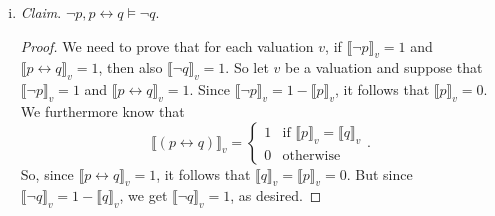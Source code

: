\begin{enumerate}[\thesection.1]
\begin{enumerate}[(i)]
			\item \emph{Claim}. $\neg p, p\leftrightarrow q\vDash \neg q$. 
			\begin{proof}
				We need to prove that for each valuation $v$, if $\llbracket \neg
				p\rrbracket_v=1$ and $\llbracket p\leftrightarrow q\rrbracket_v=1$,
				then also $\llbracket \neg q\rrbracket_v=1$. So let $v$ be a valuation
				and suppose that $\llbracket \neg p\rrbracket_v=1$ and $\llbracket
				p\leftrightarrow q\rrbracket_v=1$. Since $\llbracket \neg
				p\rrbracket_v=1-\llbracket p\rrbracket_v$, it follows that $\llbracket
				p\rrbracket_v=0$. We furthermore know that
				\[\llbracket(p\leftrightarrow q)\rrbracket_v=\begin{cases} 1 & \text{if
				} \llbracket p\rrbracket_v=\llbracket
					q\rrbracket_v\\0&\text{otherwise}\end{cases}.\] So, since $\llbracket
					p\leftrightarrow q\rrbracket_v=1$, it follows that $\llbracket
					q\rrbracket_v=\llbracket p\rrbracket_v=0$. But since $\llbracket \neg
					q\rrbracket_v=1-\llbracket q\rrbracket_v$, we get $\llbracket \neg
					q\rrbracket_v=1$, as desired.
			
			\end{proof}		
		
		\end{enumerate}
		

\end{enumerate}
